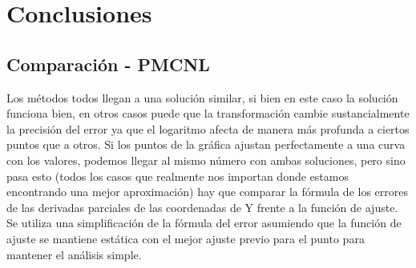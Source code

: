 \documentclass{endm}
\begin{document}
\begin{figure}%
    \centering
    \qquad
    \caption{}
    \label{fig:example}%
\end{figure}

\clearpage
\section{Conclusiones}\label{Conclusiones}

\subsection{Comparación - PMCNL}
Los métodos todos llegan a una solución similar, si bien en este caso la solución funciona bien, en otros casos puede que la transformación cambie sustancialmente la precisión del error ya que el logaritmo afecta de manera más profunda a ciertos puntos que a otros. Si los puntos de la gráfica ajustan perfectamente a una curva con los valores, podemos llegar al mismo número con ambas soluciones, pero sino pasa esto (todos los casos que realmente nos importan donde estamos encontrando una mejor aproximación) hay que comparar la fórmula de los errores de las derivadas parciales de las coordenadas de Y frente a la función de ajuste. Se utiliza una simplificación de la fórmula del error asumiendo que la función de ajuste se mantiene estática con el mejor ajuste previo para el punto para mantener el análisis simple.
\end{document}
